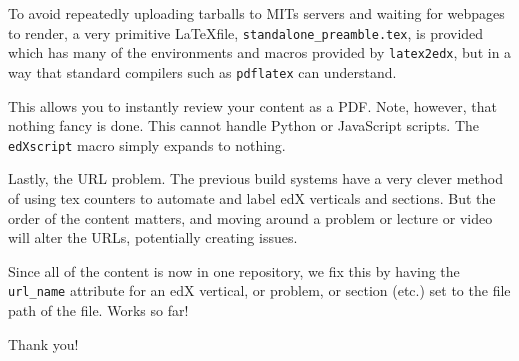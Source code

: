 \documentclass{beamer}
\begin{document}
    \begin{frame}
        To avoid repeatedly uploading tarballs to MITs servers
        and waiting for webpages to render, a very primitive
        \LaTeX file, \texttt{standalone\_preamble.tex}, is provided which
        has many of the environments and macros provided by
        \texttt{latex2edx}, but in a way that standard compilers such
        as \texttt{pdflatex} can understand.
        \par\hfill\par
        This allows you to instantly review your content as a PDF.
        Note, however, that nothing fancy is done. This cannot handle
        Python or JavaScript scripts. The
        \texttt{edXscript} macro simply expands to nothing.
    \end{frame}
    \begin{frame}
        Lastly, the URL problem. The previous build systems have a very
        clever method of using tex counters to automate and label
        edX verticals and sections. But the order of the content matters,
        and moving around a problem or lecture or video will alter the
        URLs, potentially creating issues.
        \par\hfill\par
        Since all of the content is now in one repository, we fix this
        by having the \texttt{url\_name} attribute for an edX vertical,
        or problem, or section (etc.) set to the file path of the file.
        Works so far!
    \end{frame}
    \begin{frame}
        \begin{center}
            Thank you!
        \end{center}
    \end{frame}
\end{document}
